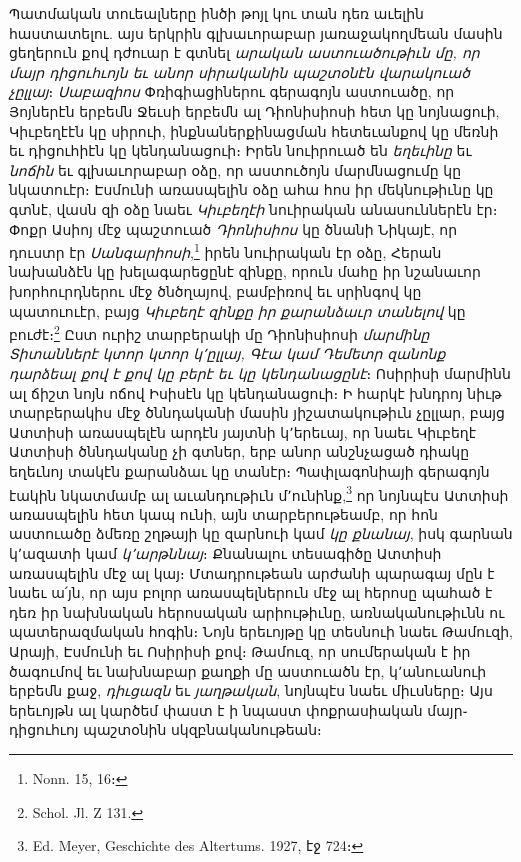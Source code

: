 \documentclass{article}
\begin{document}
{Պատմական տուեալները ինծի թոյլ կու տան դեռ աւելին հաստատելու. այս երկրին գլխաւորաբար յառաջակողմեան մասին ցեղերուն քով դժուար է գտնել \emph{արական աստուածութիւն մը, որ մայր դիցուհւոյն եւ անոր սիրականին պաշտօնէն վարակուած չըլլայ}։ \emph{Սաբազիոս} Փռիգիացիներու գերագոյն աստուածը, որ Յոյներէն երբեմն Ջեւսի երբեմն ալ Դիոնիսիոսի հետ կը նոյնացուի, Կիւբեղէէն կը սիրուի, ինքնաներքինացման հետեւանքով կը մեռնի եւ դիցուհիէն կը կենդանացուի։ Իրեն նուիրուած են \emph{եղեւինը} եւ \emph{նոճին} եւ գլխաւորաբար օձը, որ աստուծոյն մարմնացումը կը նկատուէր։ Էսմունի առասպելին օձը ահա հոս իր մեկնութիւնը կը գտնէ, վասն զի օձը նաեւ \emph{Կիւբեղէի} նուիրական անասուններէն էր։ Փոքր Ասիոյ մէջ պաշտուած \emph{Դիոնիսիոս} կը ծնանի Նիկայէ, որ դուստր էր \emph{Սանգարիոսի},\footnote{Nonn. 15, 16։} իրեն նուիրական էր օձը, Հերան նախանձէն կը խելագարեցընէ զինքը, որուն մահը իր նշանաւոր խորհուրդներու մէջ ծնծղայով, բամբիռով եւ սրինգով կը պատուուէր, բայց \emph{Կիւբեղէ զինքը իր քարանձաւր տանելով} կը բուժէ։\footnote{Schol. Jl. Z 131.} Ըստ ուրիշ տարբերակի մը Դիոնիսիոսի \emph{մարմինը Տիտաններէ կտոր կտոր կ՚ըլլայ, Գէա կամ Դեմետր զանոնք դարձեալ քով է քով կը բերէ եւ կը կենդանացընէ}։ Ոսիրիսի մարմինն ալ ճիշտ նոյն ոճով Իսիսէն կը կենդանացուի։ Ի հարկէ խնդրոյ նիւթ տարբերակիս մէջ ծննդականի մասին յիշատակութիւն չըլլար, բայց Ատտիսի առասպելէն արդէն յայտնի կ՚երեւայ, որ նաեւ Կիւբեղէ Ատտիսի ծննդականը չի գտներ, երբ անոր անշնչացած դիակը եղեւնոյ տակէն քարանձաւ կը տանէր։ Պափլագոնիայի գերագոյն էակին նկատմամբ ալ աւանդութիւն մ՚ունինք,\footnote{Ed. Meyer, Geschichte des Altertums. 1927, էջ 724։} որ նոյնպէս Ատտիսի առասպելին հետ կապ ունի, այն տարբերութեամբ, որ հոն աստուածը ձմեռը շղթայի կը զարնուի կամ \emph{կը քնանայ}, իսկ գարնան կ՚ազատի կամ \emph{կ՚արթննայ}։ Քնանալու տեսագիծը Ատտիսի առասպելին մէջ ալ կայ։ Մտադրութեան արժանի պարագայ մըն է նաեւ ա՛յն, որ այս բոլոր առասպելներուն մէջ ալ հերոսը պահած է դեռ իր նախնական հերոսական արիութիւնը, առնականութիւնն ու պատերազմական հոգին։ Նոյն երեւոյթը կը տեսնուի նաեւ Թամուզի, Արայի, Էսմունի եւ Ոսիրիսի քով։ Թամուզ, որ սումերական է իր ծագումով եւ նախնաբար քաղքի մը աստուածն էր, կ՚անուանուի երբեմն քաջ, \emph{դիւցազն} եւ \emph{յաղթական}, նոյնպէս նաեւ միւսները։ Այս երեւոյթն ալ կարծեմ փաստ է ի նպաստ փոքրասիական մայր֊դիցուհւոյ պաշտօնին սկզբնականութեան։

}
\end{document}
